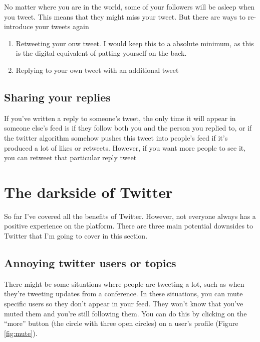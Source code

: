 \documentclass[]{book}
\begin{document}
No matter where you are in the world, some of your followers will be asleep when you tweet. This means that they might miss your tweet. But there are ways to re-introduce your tweets again

\begin{enumerate}
\def\labelenumi{\arabic{enumi}.}
\item
  Retweeting your onw tweet. I would keep this to a absolute minimum, as this is the digital equivalent of patting yourself on the back.
\item
  Replying to your own tweet with an additional tweet
\end{enumerate}

\hypertarget{sharing-your-replies}{%
\section{Sharing your replies}\label{sharing-your-replies}}

If you've written a reply to someone's tweet, the only time it will appear in someone else's feed is if they follow both you and the person you replied to, or if the twitter algorithm somehow pushes this tweet into people's feed if it's produced a lot of likes or retweets. However, if you want more people to see it, you can retweet that particular reply tweet

\hypertarget{the-darkside-of-twitter}{%
\chapter{The darkside of Twitter}\label{the-darkside-of-twitter}}

So far I've covered all the benefits of Twitter. However, not everyone always has a positive experience on the platform. There are three main potential downsides to Twitter that I'm going to cover in this section.

\hypertarget{annoying-twitter-users-or-topics}{%
\section{Annoying twitter users or topics}\label{annoying-twitter-users-or-topics}}

There might be some situations where people are tweeting a lot, such as when they're tweeting updates from a conference. In these situations, you can mute specific users so they don't appear in your feed. They won't know that you've muted them and you're still following them. You can do this by clicking on the ``more'' button (the circle with three open circles) on a user's profile (Figure \ref{fig:mute}).
\end{document}
